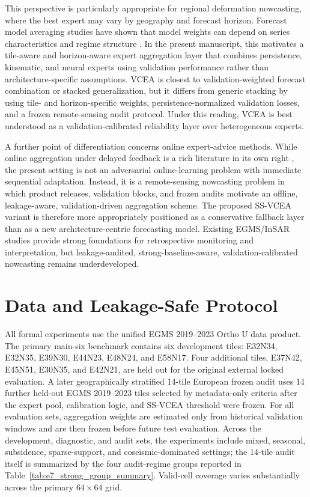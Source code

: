 \documentclass[lettersize,journal]{IEEEtran}
\newcommand{\egms}{EGMS 2019--2023 Ortho U}
\begin{document}
This perspective is particularly appropriate for regional deformation nowcasting, where the best expert may vary by geography and forecast horizon. Forecast model averaging studies have shown that model weights can depend on series characteristics and regime structure \cite{monteromanso2020fforma}. In the present manuscript, this motivates a tile-aware and horizon-aware expert aggregation layer that combines persistence, kinematic, and neural experts using validation performance rather than architecture-specific assumptions. VCEA is closest to validation-weighted forecast combination or stacked generalization, but it differs from generic stacking by using tile- and horizon-specific weights, persistence-normalized validation losses, and a frozen remote-sensing audit protocol. Under this reading, VCEA is best understood as a validation-calibrated reliability layer over heterogeneous experts.

A further point of differentiation concerns online expert-advice methods. While online aggregation under delayed feedback is a rich literature in its own right \cite{joulani2013delayed}, the present setting is not an adversarial online-learning problem with immediate sequential adaptation. Instead, it is a remote-sensing nowcasting problem in which product releases, validation blocks, and frozen audits motivate an offline, leakage-aware, validation-driven aggregation scheme. The proposed SS-VCEA variant is therefore more appropriately positioned as a conservative fallback layer than as a new architecture-centric forecasting model. Existing EGMS/InSAR studies provide strong foundations for retrospective monitoring and interpretation, but leakage-audited, strong-baseline-aware, validation-calibrated nowcasting remains underdeveloped.

\section{Data and Leakage-Safe Protocol}
All formal experiments use the unified \egms{} data product. The primary main-six benchmark contains six development tiles: E32N34, E32N35, E39N30, E44N23, E48N24, and E58N17. Four additional tiles, E37N42, E45N51, E30N35, and E42N21, are held out for the original external locked evaluation. A later geographically stratified 14-tile European frozen audit uses 14 further held-out EGMS 2019--2023 tiles selected by metadata-only criteria after the expert pool, calibration logic, and SS-VCEA threshold were frozen. For all evaluation sets, aggregation weights are estimated only from historical validation windows and are then frozen before future test evaluation. Across the development, diagnostic, and audit sets, the experiments include mixed, seasonal, subsidence, sparse-support, and coseismic-dominated settings; the 14-tile audit itself is summarized by the four audit-regime groups reported in Table~\ref{tab:e7_strong_group_summary}. Valid-cell coverage varies substantially across the primary $64\times64$ grid.
\end{document}
